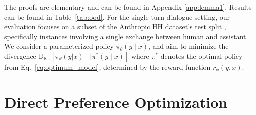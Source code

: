 The proofs are elementary and can be found in Appendix \ref{app:lemma1}. Results can be found in Table~\ref{tab:ood}. For the single-turn dialogue setting, our evaluation focuses on a subset of the Anthropic HH dataset's test split \citep{bai2022training}, specifically instances involving a single exchange between human and assistant. We consider a parameterized policy $\pi_{\theta}(y\mid x)$, and aim to minimize the divergence $\mathbb{D}_{\text{KL}}[\pi_{\theta}(y|x) \mid \mid \pi^*(y\mid x)]$ where $\pi^*$ denotes the optimal policy from Eq.~\ref{eq:optimum_model}, determined by the reward function $r_{\phi}(y, x)$. \section{Direct Preference Optimization}\label{sec:DPO}

